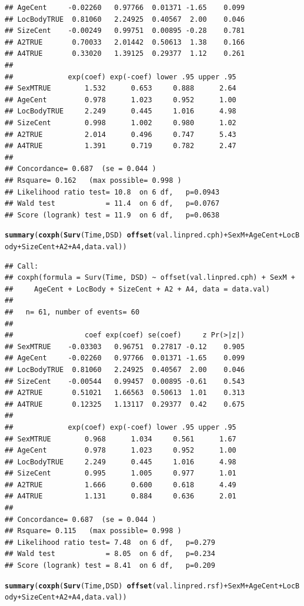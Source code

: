 \documentclass{article}\usepackage[]{graphicx}\usepackage[]{color}
\makeatletter
\newcommand{\hlopt}[1]{\textcolor[rgb]{0,0,0}{#1}}%
\newcommand{\hlstd}[1]{\textcolor[rgb]{0.345,0.345,0.345}{#1}}%
\newcommand{\hlkwd}[1]{\textcolor[rgb]{0.737,0.353,0.396}{\textbf{#1}}}%
\newenvironment{kframe}{%
 \def\at@end@of@kframe{}%
 \ifinner\ifhmode%
  \def\at@end@of@kframe{\end{minipage}}%
  \begin{minipage}{\columnwidth}%
 \fi\fi%
 \def\FrameCommand##1{\hskip\@totalleftmargin \hskip-\fboxsep
 \colorbox{shadecolor}{##1}\hskip-\fboxsep
     \hskip-\linewidth \hskip-\@totalleftmargin \hskip\columnwidth}%
 \MakeFramed {\advance\hsize-\width
   \@totalleftmargin\z@ \linewidth\hsize
   \@setminipage}}%
 {\par\unskip\endMakeFramed%
 \at@end@of@kframe}
\newenvironment{knitrout}{}{} %
\makeatother
\begin{document}
\begin{knitrout}
\begin{kframe}
\begin{verbatim}
## AgeCent     -0.02260   0.97766  0.01371 -1.65    0.099
## LocBodyTRUE  0.81060   2.24925  0.40567  2.00    0.046
## SizeCent    -0.00249   0.99751  0.00895 -0.28    0.781
## A2TRUE       0.70033   2.01442  0.50613  1.38    0.166
## A4TRUE       0.33020   1.39125  0.29377  1.12    0.261
## 
##             exp(coef) exp(-coef) lower .95 upper .95
## SexMTRUE        1.532      0.653     0.888      2.64
## AgeCent         0.978      1.023     0.952      1.00
## LocBodyTRUE     2.249      0.445     1.016      4.98
## SizeCent        0.998      1.002     0.980      1.02
## A2TRUE          2.014      0.496     0.747      5.43
## A4TRUE          1.391      0.719     0.782      2.47
## 
## Concordance= 0.687  (se = 0.044 )
## Rsquare= 0.162   (max possible= 0.998 )
## Likelihood ratio test= 10.8  on 6 df,   p=0.0943
## Wald test            = 11.4  on 6 df,   p=0.0767
## Score (logrank) test = 11.9  on 6 df,   p=0.0638
\end{verbatim}
\begin{alltt}
\hlkwd{summary}\hlstd{(}\hlkwd{coxph}\hlstd{(}\hlkwd{Surv}\hlstd{(Time, DSD)} \hlopt{~} \hlkwd{offset}\hlstd{(val.linpred.cph)} \hlopt{+} \hlstd{SexM} \hlopt{+} \hlstd{AgeCent} \hlopt{+} \hlstd{LocBody} \hlopt{+} \hlstd{SizeCent} \hlopt{+} \hlstd{A2} \hlopt{+} \hlstd{A4, data.val))}
\end{alltt}
\begin{verbatim}
## Call:
## coxph(formula = Surv(Time, DSD) ~ offset(val.linpred.cph) + SexM + 
##     AgeCent + LocBody + SizeCent + A2 + A4, data = data.val)
## 
##   n= 61, number of events= 60 
## 
##                 coef exp(coef) se(coef)     z Pr(>|z|)
## SexMTRUE    -0.03303   0.96751  0.27817 -0.12    0.905
## AgeCent     -0.02260   0.97766  0.01371 -1.65    0.099
## LocBodyTRUE  0.81060   2.24925  0.40567  2.00    0.046
## SizeCent    -0.00544   0.99457  0.00895 -0.61    0.543
## A2TRUE       0.51021   1.66563  0.50613  1.01    0.313
## A4TRUE       0.12325   1.13117  0.29377  0.42    0.675
## 
##             exp(coef) exp(-coef) lower .95 upper .95
## SexMTRUE        0.968      1.034     0.561      1.67
## AgeCent         0.978      1.023     0.952      1.00
## LocBodyTRUE     2.249      0.445     1.016      4.98
## SizeCent        0.995      1.005     0.977      1.01
## A2TRUE          1.666      0.600     0.618      4.49
## A4TRUE          1.131      0.884     0.636      2.01
## 
## Concordance= 0.687  (se = 0.044 )
## Rsquare= 0.115   (max possible= 0.998 )
## Likelihood ratio test= 7.48  on 6 df,   p=0.279
## Wald test            = 8.05  on 6 df,   p=0.234
## Score (logrank) test = 8.41  on 6 df,   p=0.209
\end{verbatim}
\begin{alltt}
\hlkwd{summary}\hlstd{(}\hlkwd{coxph}\hlstd{(}\hlkwd{Surv}\hlstd{(Time, DSD)} \hlopt{~} \hlkwd{offset}\hlstd{(val.linpred.rsf)} \hlopt{+} \hlstd{SexM} \hlopt{+} \hlstd{AgeCent} \hlopt{+} \hlstd{LocBody} \hlopt{+} \hlstd{SizeCent} \hlopt{+} \hlstd{A2} \hlopt{+} \hlstd{A4, data.val))}
\end{alltt}



\end{kframe}
\end{knitrout}
\end{document}
